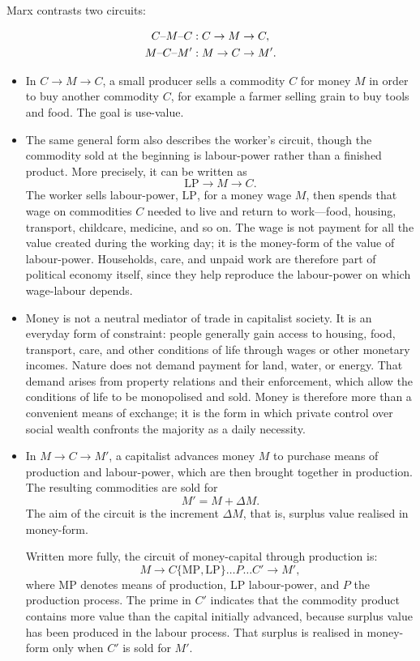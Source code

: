 Marx contrasts two circuits:

\begin{align}
  C \text{--} M \text{--} C &: C \rightarrow M \rightarrow C,
  \label{eq:cmc}\\
  M \text{--} C \text{--} M' &: M \rightarrow C \rightarrow M'.
  \label{eq:mcm}
\end{align}

\begin{itemize}[leftmargin=1.5em]
  \item In \(C \rightarrow M \rightarrow C\), a small producer sells a commodity \(C\) for money \(M\) in order to buy another commodity \(C\), for example a farmer selling grain to buy tools and food. The goal is use-value.

  \item The same general form also describes the worker's circuit, though the commodity sold at the beginning is labour-power rather than a finished product. More precisely, it can be written as
  \[
  \mathrm{LP} \rightarrow M \rightarrow C.
  \]
  The worker sells labour-power, \(\mathrm{LP}\), for a money wage \(M\), then spends that wage on commodities \(C\) needed to live and return to work---food, housing, transport, childcare, medicine, and so on. The wage is not payment for all the value created during the working day; it is the money-form of the value of labour-power. Households, care, and unpaid work are therefore part of political economy itself, since they help reproduce the labour-power on which wage-labour depends.

  \item Money is not a neutral mediator of trade in capitalist society. It is an everyday form of constraint: people generally gain access to housing, food, transport, care, and other conditions of life through wages or other monetary incomes. Nature does not demand payment for land, water, or energy. That demand arises from property relations and their enforcement, which allow the conditions of life to be monopolised and sold. Money is therefore more than a convenient means of exchange; it is the form in which private control over social wealth confronts the majority as a daily necessity.

  \item In \(M \rightarrow C \rightarrow M'\), a capitalist advances money \(M\) to purchase means of production and labour-power, which are then brought together in production. The resulting commodities are sold for
  \[
  M' = M + \Delta M.
  \]
  The aim of the circuit is the increment \(\Delta M\), that is, surplus value realised in money-form.

  Written more fully, the circuit of money-capital through production is:
  \[
  M
  \rightarrow
  C\{\mathrm{MP},\mathrm{LP}\}
  \dots P \dots
  C'
  \rightarrow
  M',
  \]
  where \(\mathrm{MP}\) denotes means of production, \(\mathrm{LP}\) labour-power, and \(P\) the production process. The prime in \(C'\) indicates that the commodity product contains more value than the capital initially advanced, because surplus value has been produced in the labour process. That surplus is realised in money-form only when \(C'\) is sold for \(M'\).
\end{itemize}

